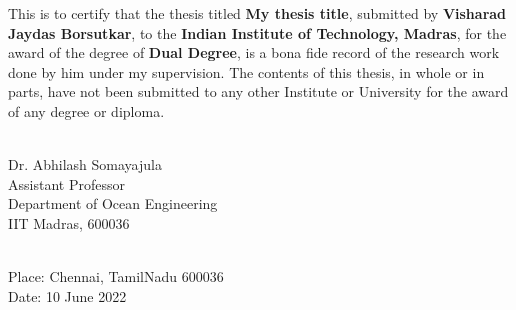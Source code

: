 \certificate


This is to certify that the thesis titled {\bf  My thesis title}, submitted by {\bf Visharad Jaydas Borsutkar}, to the {\bf Indian Institute of Technology, Madras}, for the award of the degree of {\bf Dual Degree}, is a bona fide record of the research work done by him under my supervision. The contents of this thesis, in whole or in parts, have not been submitted to any other Institute or University for the award of any degree or diploma.
\\[3cm]

\begin{singlespacing}
\hspace*{-0.25in}
\parbox{2.5in}{
\\[0.25cm]
\noindent Dr. Abhilash Somayajula \\ [0.15cm]
\noindent Assistant Professor \\[0.15cm]
\noindent Department of Ocean Engineering\\[0.15cm]
\noindent IIT Madras, 600036
} 
\end{singlespacing}
\\[2cm]


\noindent Place: Chennai, TamilNadu 600036\\
Date: 10 June 2022  
